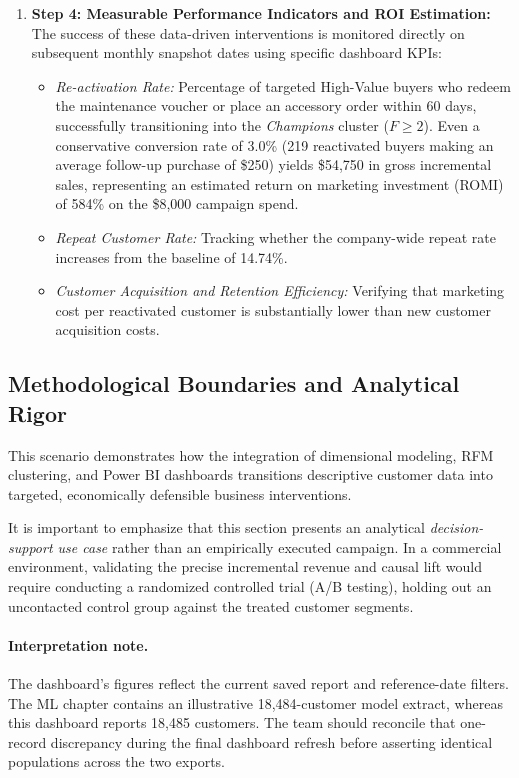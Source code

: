 \begin{enumerate}
    \item \textbf{Step 4: Measurable Performance Indicators and ROI Estimation:}
    The success of these data-driven interventions is monitored directly on subsequent monthly snapshot dates using specific dashboard KPIs:
    \begin{itemize}
        \item \emph{Re-activation Rate:} Percentage of targeted High-Value buyers who redeem the maintenance voucher or place an accessory order within 60 days, successfully transitioning into the \textit{Champions} cluster ($F \ge 2$). Even a conservative conversion rate of 3.0\% (219 reactivated buyers making an average follow-up purchase of \$250) yields \$54,750 in gross incremental sales, representing an estimated return on marketing investment (ROMI) of 584\% on the \$8,000 campaign spend.
        \item \emph{Repeat Customer Rate:} Tracking whether the company-wide repeat rate increases from the baseline of 14.74\%.
        \item \emph{Customer Acquisition and Retention Efficiency:} Verifying that marketing cost per reactivated customer is substantially lower than new customer acquisition costs.
    \end{itemize}
\end{enumerate}

\subsection{Methodological Boundaries and Analytical Rigor}
This scenario demonstrates how the integration of dimensional modeling, RFM clustering, and Power BI dashboards transitions descriptive customer data into targeted, economically defensible business interventions. 

It is important to emphasize that this section presents an analytical \emph{decision-support use case} rather than an empirically executed campaign. In a commercial environment, validating the precise incremental revenue and causal lift would require conducting a randomized controlled trial (A/B testing), holding out an uncontacted control group against the treated customer segments.

\paragraph{Interpretation note.} The dashboard's figures reflect the current saved report and reference-date filters. The ML chapter contains an illustrative 18,484-customer model extract, whereas this dashboard reports 18,485 customers. The team should reconcile that one-record discrepancy during the final dashboard refresh before asserting identical populations across the two exports.

